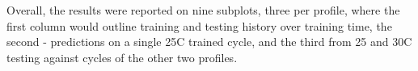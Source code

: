 {Overall, the results were reported on nine subplots, three per profile, where the first column would outline training and testing history over training time, the second - predictions on a single 25\textdegree{}C trained cycle, and the third from 25 and 30\textdegree{}C testing against cycles of the other two profiles.
}
